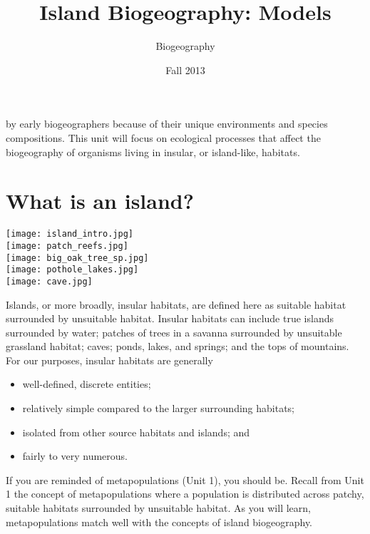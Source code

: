 \documentclass[letterpaper]{tufte-handout}
\title{Island Biogeography: Models}
\author[Biogeography]{Biogeography}
\date{Fall 2013} %
\begin{document}
\maketitle	%



 by early biogeographers because of their unique environments and species compositions.  This unit will focus on ecological processes that affect the biogeography of organisms living in insular, or island-like, habitats. 

\section{What is an island?}\label{sec:island}
\begin{marginfigure}%
	\centering
	\texttt{[image: island\_intro.jpg]}\\
	\texttt{[image: patch\_reefs.jpg]}\\
	\texttt{[image: big\_oak\_tree\_sp.jpg]}\\
	\texttt{[image: pothole\_lakes.jpg]}\\
	\texttt{[image: cave.jpg]}
\end{marginfigure} 

Islands, or more broadly, insular habitats, are defined here as suitable habitat surrounded by unsuitable habitat. Insular habitats can include true islands surrounded by water; patches of trees in a savanna surrounded by unsuitable grassland habitat; caves; ponds, lakes, and springs; and the tops of mountains. For our purposes, insular habitats are generally
\begin{itemize}
	\item well-defined, discrete entities; 
	\item relatively simple compared to the larger surrounding habitats;
	\item isolated from other source habitats and islands; and
	\item fairly to very numerous.
\end{itemize}

If you are reminded of metapopulations (Unit 1), you should be.  Recall from Unit 1 the concept of metapopulations where a population is distributed across patchy, suitable habitats surrounded by unsuitable habitat. As you will learn, metapopulations match well with the concepts of island biogeography. 
\end{document}
